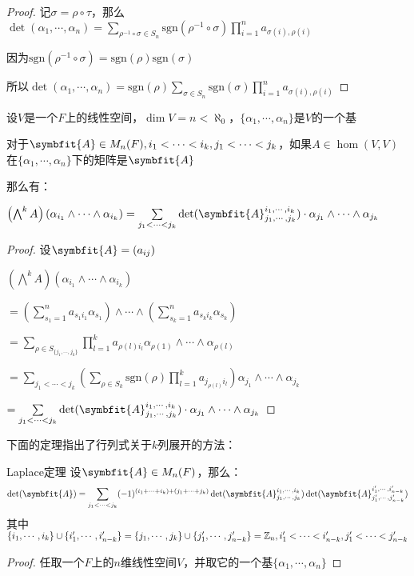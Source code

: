 \documentclass[12pt, a4paper, oneside, UTF8]{ctexbook}
\begin{document}
\begin{para}{0}
\begin{proof}
						记$\sigma =\rho \circ \tau $，那么$\det(\alpha_1,\cdots,\alpha_n)=\sum_{\rho^{-1} \circ \sigma  \in S_n} \text{sgn}(\rho^{-1} \circ \sigma) \prod_{i=1}^n a_{\sigma (i),\rho (i)}$

						因为$\text{sgn}(\rho^{-1} \circ \sigma)=\text{sgn}(\rho )\text{sgn}(\sigma )$

						所以$\det(\alpha_1,\cdots,\alpha_n)=\text{sgn}(\rho )\sum_{\sigma \in S_n} \text{sgn}(\sigma) \prod_{i=1}^n a_{\sigma(i),\rho (i)}$
					\end{proof}
					\begin{lemma}{}{}
						设$V$是一个$F$上的线性空间，$\dim V = n < \aleph_0$，$\{\alpha_1,\cdots,\alpha_n\}$是$V$的一个基

						对于$\symbfit{A} \in M_n(F),i_1 < \cdots < i_k,j_1 < \cdots < j_k$，如果$A \in \hom(V,V)$在$\{\alpha_1,\cdots,\alpha_n\}$下的矩阵是$\symbfit{A}$
						
						那么有：

						$\left(\bigwedge^{k} A\right)(\alpha_{i_1}\wedge \cdots \wedge \alpha_{i_k})=\sum\limits_{j_1 < \cdots < j_k}\det(\symbfit{A}_{j_1,\cdots,j_k}^{i_1,\cdots,i_k})\cdot \alpha_{j_1} \wedge \cdots \wedge \alpha_{j_k}$
					\end{lemma}
					\begin{proof}
						设$\symbfit{A}=(a_{ij})$

						$\left(\bigwedge^{k} A\right)(\alpha_{i_1}\wedge \cdots \wedge \alpha_{i_k})$

						$=\left(\sum\limits_{s_1=1}^{n} a_{s_1i_1}\alpha_{s_1}\right)\wedge \cdots \wedge \left(\sum\limits_{s_k=1}^{n} a_{s_ki_k}\alpha_{s_k}\right)$

						$=\sum\limits_{\rho \in S_{\{j_1,\cdots,j_k\}}} \prod_{l=1}^{k} a_{\rho(l)i_l} \alpha_{\rho(1)}\wedge \cdots \wedge \alpha_{\rho(l)}$

						$=\sum\limits_{j_1 < \cdots < j_k}\left(\sum\limits_{\rho \in S_k}\text{sgn}(\rho )\prod_{l=1}^{k} a_{j_{\rho(l)}i_l} \right) \alpha_{j_1}\wedge \cdots \wedge \alpha_{j_k}$

						$=\sum\limits_{j_1 < \cdots < j_k}\det(\symbfit{A}_{j_1,\cdots,j_k}^{i_1,\cdots,i_k})\cdot \alpha_{j_1} \wedge \cdots \wedge \alpha_{j_k}$
					\end{proof}
					下面的定理指出了行列式关于$k$列展开的方法：
					\begin{them}{Laplace定理}{}
						设$\symbfit{A} \in M_n(F)$，那么：
						\begin{equation}
							\det(\symbfit{A})=\sum\limits_{j_1 < \cdots < j_k} (-1)^{(i_1+\cdots+i_k)+(j_1+\cdots+j_k)}\det(\symbfit{A}_{j_1,\cdots,j_k}^{i_1,\cdots,i_k})\det(\symbfit{A}_{j_1',\cdots,j_{n-k}'}^{i_1',\cdots,i_{n-k}'})
						\end{equation}
						其中$\{i_1,\cdots,i_k\}\cup \{i_1',\cdots,i_{n-k}'\}=\{j_1,\cdots,j_k\}\cup\{j_1',\cdots,j_{n-k}'\}=\mathbb{Z}_n,i_1'<\cdots<i_{n-k}',j_1'<\cdots<j_{n-k}'$
					\end{them}
					\begin{proof}
						任取一个$F$上的$n$维线性空间$V$，并取它的一个基$\{\alpha_1,\cdots,\alpha_n\}$


\end{proof}
\end{para}
\end{document}
